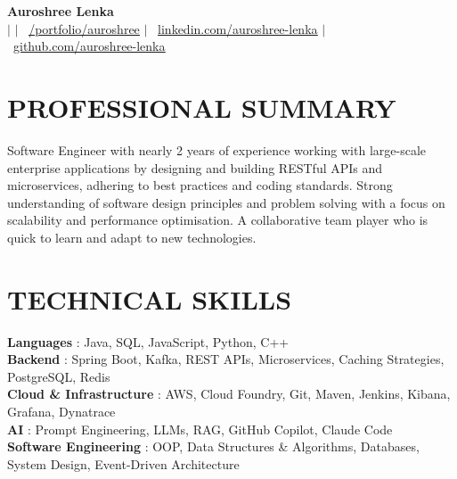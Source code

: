\documentclass[a4paper,11pt]{article}
\begin{document}
\begin{center}
    \textbf{\Huge Auroshree Lenka} \\ \vspace{5pt}
    {\setlength{\baselineskip}{16pt}
    \small {} \hspace{1pt} $|$
    \hspace{1pt} \faEnvelope \hspace{2pt}{auroshreelenka@gmail.com} \hspace{1pt} $|$ 
    \hspace{1pt} \faGlobe~\href{https://auroshree-lenka.vercel.app}{\underline{/portfolio/auroshree}} \hspace{1pt} $|$
    \hspace{1pt} \faLinkedin~\href{https://linkedin.com/in/auroshree-lenka}{\underline{linkedin.com/auroshree-lenka}} $|$
    \hspace{1pt} \faGithub~\href{https://github.com/Alexwolf21}{\underline{github.com/auroshree-lenka}}
    }
    \\ \vspace{-3pt}
\end{center}

\section{PROFESSIONAL SUMMARY}
 Software Engineer with nearly 2 years of experience working with large-scale enterprise applications by designing and building RESTful APIs and microservices, adhering to best practices and coding standards. Strong understanding of software design principles and problem solving with a focus on scalability and performance optimisation. A collaborative team player who is quick to learn and adapt to new technologies.

\section{TECHNICAL SKILLS}
 \begin{itemize}[leftmargin=0in, label={}]
    \small{\item{
     \textbf{Languages} {: Java, SQL, JavaScript, Python, C++}\vspace{2pt} \\
     \textbf{Backend} {: Spring Boot, Kafka, REST APIs, Microservices, Caching Strategies, PostgreSQL, Redis} \vspace{2pt} \\
     \textbf{Cloud \& Infrastructure} {: AWS, Cloud Foundry, Git, Maven, Jenkins, Kibana, Grafana, Dynatrace} \vspace{2pt} \\
     \textbf{AI} {: Prompt Engineering, LLMs, RAG, GitHub Copilot, Claude Code} \vspace{2pt} \\
     \textbf{Software Engineering} {: OOP, Data Structures \& Algorithms, Databases, System Design, Event-Driven Architecture} 
    }}
 \end{itemize}
\end{document}
